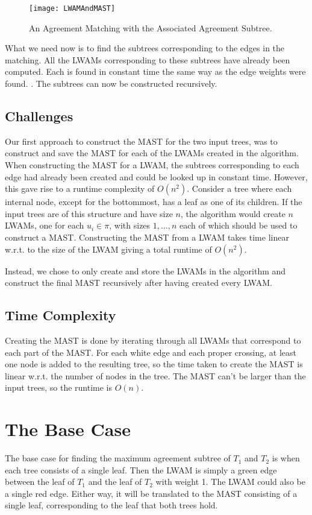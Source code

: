 \begin{figure}
	\label{lwam_mast_figure}
	\texttt{[image: LWAMAndMAST]}
	\caption{An Agreement Matching with the Associated Agreement Subtree. \cite{nlogn}}
\end{figure}

What we need now is to find the subtrees corresponding to the edges in the matching. All the LWAMs corresponding to these subtrees have already been computed. Each is found in constant time the same way as the edge weights were found.  . The subtrees can now be constructed recursively.

\subsection{Challenges} 
Our first approach to construct the MAST for the two input trees, was to construct and save the MAST for each of the LWAMs created in the algorithm. When constructing the MAST for a LWAM, the subtrees corresponding to each edge had already been created and could be looked up in constant time. However, this gave rise to a runtime complexity of $O(n^2)$. Consider a tree where each internal node, except for the bottommost, has a leaf as one of its children. If the input trees are of this structure and have size $n$, the algorithm would create $n$ LWAMs, one for each $u_i \in \pi$, with sizes $1, ..., n$ each of which should be used to construct a MAST. Constructing the MAST from a LWAM takes time linear w.r.t. to the size of the LWAM giving a total runtime of $O(n^2)$.

Instead, we chose to only create and store the LWAMs in the algorithm and construct the final MAST recursively after having created every LWAM.

\subsection{Time Complexity}
Creating the MAST is done by iterating through all LWAMs that correspond to each part of the MAST. For each white edge and each proper crossing, at least one node is added to the resulting tree, so the time taken to create the MAST is linear w.r.t. the number of nodes in the tree. The MAST can't be larger than the input trees, so the runtime is $O(n)$.

\section{The Base Case}
The base case for finding the maximum agreement subtree of $T_1$ and $T_2$ is when each tree consists of a single leaf. Then the LWAM is simply a green edge between the leaf of $T_1$ and the leaf of $T_2$ with weight 1. The LWAM could also be a single red edge. Either way, it will be translated to the MAST consisting of a single leaf, corresponding to the leaf that both trees hold.

